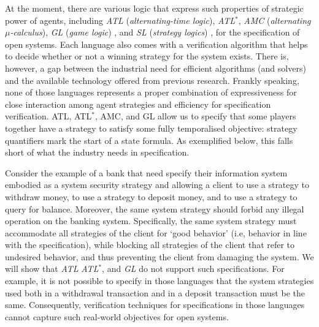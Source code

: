 \documentclass[11pt]{article}
\newcounter{sequent1}
\newcounter{sequent2}
\newcounter{sequent3}
\newcounter{sequent4}
\begin{document}
At the moment, there are various logic that express such properties of strategic power of agents,
including {\em ATL} ({\em alternating-time logic}), 
{\em ATL}$^*$, {\em AMC} ({\em alternating $\mu$-calculus}),
{\em GL} ({\em game logic}) \cite{AHK02}, 
and {\em SL} ({\em strategy logics}) \cite{CLM10,CHP10,MMV10}, 
for the specification of open systems.  
Each language also comes with a verification algorithm that 
helps to decide whether or not a winning strategy for the system exists.  
There is, however, a gap between the industrial need 
for efficient algorithms (and solvers) and the available technology offered from previous research.  
Frankly speaking, 
none of those languages represents a proper combination of 
expressiveness for close interaction among agent strategies 
and efficiency for specification verification.  
ATL, ATL$^*$, AMC, and GL \cite{AHK02} allow 
us to specify that some players together have a strategy to 
satisfy some fully temporalised objective: strategy quantifiers mark the start of a state formula.
As exemplified below, this falls short of what the industry needs in specification.  

Consider the example of a bank that need specify their information system 
embodied as a system security strategy and 
allowing a client to use a strategy to withdraw money, 
to use a strategy to deposit money, and to use a strategy to query for balance.  
Moreover, the same system strategy should forbid any illegal 
operation on the banking system.  
Specifically, the same system strategy must accommodate all strategies 
of the client for `good behavior' 
(i.e, behavior in line with the specification), 
while blocking all strategies of the client that refer to undesired behavior, 
and thus preventing the client from damaging the system.
We will show that 
{\em ATL} %
{\em ATL}$^*$, %
and 
{\em GL} %
\cite{AHK02}  
do not support such specifications.  
For example, it is not possible to specify in those languages that 
the system strategies used both in a withdrawal transaction and 
in a deposit transaction must be the same.  
Consequently, verification techniques for specifications in those languages 
cannot capture such real-world objectives for open systems.  
\end{document}
